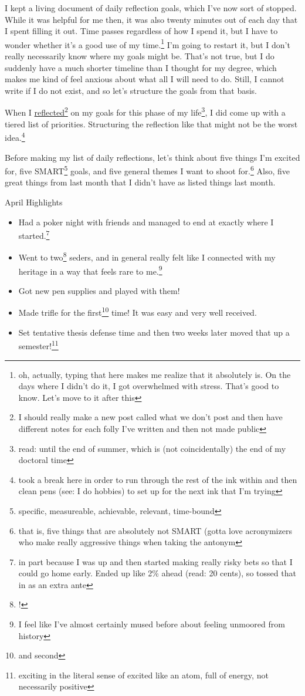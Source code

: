 \documentclass[12pt]{article}
\renewcommand{\,}{\textsuperscript{,}}
\begin{document}
I kept a living document of daily reflection goals, which I've now sort of stopped.  
While it was helpful for me then, it was also twenty minutes out of each day that I spent filling it out.  
Time passes regardless of how I spend it, but I have to wonder whether it's a good use of my time.\footnote{oh, actually, typing that here makes me realize that it absolutely is.  
On the days where I didn't do it, I got overwhelmed with stress.  
That's good to know. Let's move to it after this}  
I'm going to restart it, but I don't really necessarily know where my goals might be.  
That's not true, but I do suddenly have a much shorter timeline than I thought for my degree, which makes me kind of feel anxious about what all I will need to do.  
Still, I cannot write if I do not exist, and so let's structure the goals from that basis.

When I \href{what-we-dont-write}{reflected}\footnote{I should really make a new post called what we don't post and then have different notes for each folly I've written and then not made public} on my goals for this phase of my life\footnote{read: until the end of summer, which is (not coincidentally) the end of my doctoral time}, I did come up with a tiered list of priorities.  
Structuring the reflection like that might not be the worst idea.\footnote{took a break here in order to run through the rest of the ink within and then clean pens (see: I do hobbies) to set up for the next ink that I'm trying}

Before making my list of daily reflections, let's think about five things I'm excited for, five SMART\footnote{specific, measureable, achievable, relevant, time-bound} goals, and five general themes I want to shoot for.\footnote{that is, five things that are absolutely not SMART (gotta love acronymizers who make really aggressive things when taking the antonym}  
Also, five great things from last month that I didn't have as listed things last month.

April Highlights  
\begin{itemize}
\item Had a poker night with friends and managed to end at exactly where I started.\footnote{in part because I was up and then started making really risky bets so that I could go home early. Ended up like 2\% ahead (read: 20 cents), so tossed that in as an extra ante} 
\item Went to two\footnote{!} seders, and in general really felt like I connected with my heritage in a way that feels rare to me.\footnote{I feel like I've almost certainly mused before about feeling unmoored from history}  
\item Got new pen supplies and played with them!  
\item Made trifle for the first\footnote{and second} time! It was easy and very well received.  
\item Set tentative thesis defense time and then two weeks later moved that up a semester!\footnote{exciting in the literal sense of excited like an atom, full of energy, not necessarily positive}
\end{itemize}
\end{document}
